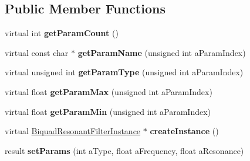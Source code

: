 \subsection*{Public Member Functions}
\begin{DoxyCompactItemize}
\item 
\mbox{\label{class_so_loud_1_1_biquad_resonant_filter_af5d39bb2f782bcc8e78507c8d5c3b829}} 
virtual int {\bfseries get\+Param\+Count} ()
\item 
\mbox{\label{class_so_loud_1_1_biquad_resonant_filter_a95ede0d904526f72ec062f971399859c}} 
virtual const char $\ast$ {\bfseries get\+Param\+Name} (unsigned int a\+Param\+Index)
\item 
\mbox{\label{class_so_loud_1_1_biquad_resonant_filter_a2a5e7f043e47d91643bfb97a74c38a48}} 
virtual unsigned int {\bfseries get\+Param\+Type} (unsigned int a\+Param\+Index)
\item 
\mbox{\label{class_so_loud_1_1_biquad_resonant_filter_a2019281e3cece0454a5e5c1083cbb944}} 
virtual float {\bfseries get\+Param\+Max} (unsigned int a\+Param\+Index)
\item 
\mbox{\label{class_so_loud_1_1_biquad_resonant_filter_a23f3562ccc0ea5e32f1286fa896bac78}} 
virtual float {\bfseries get\+Param\+Min} (unsigned int a\+Param\+Index)
\item 
\mbox{\label{class_so_loud_1_1_biquad_resonant_filter_a78751dd7921e7f8d2e7f88c0323a9557}} 
virtual \mbox{\hyperlink{class_so_loud_1_1_biquad_resonant_filter_instance}{Biquad\+Resonant\+Filter\+Instance}} $\ast$ {\bfseries create\+Instance} ()
\item 
\mbox{\label{class_so_loud_1_1_biquad_resonant_filter_a738ef9b2060b5e758ca994c916411823}} 
result {\bfseries set\+Params} (int a\+Type, float a\+Frequency, float a\+Resonance)
\end{DoxyCompactItemize}
